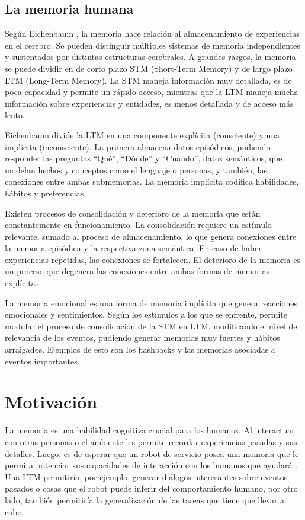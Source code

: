 \subsection{La memoria humana}
Según Eichenbaum \cite{Eichenbaum:2008}, la memoria hace relación al almacenamiento de experiencias en el cerebro. Se pueden distinguir múltiples sistemas de memoria independientes y sustentados por distintas estructuras cerebrales. A grandes rasgos, la memoria se puede dividir en de corto plazo STM (Short-Term Memory) y de largo plazo LTM (Long-Term Memory). La STM maneja información muy detallada, es de poca capacidad y permite un rápido acceso, mientras que la LTM maneja mucha información sobre experiencias y entidades, es menos detallada y de acceso más lento.

Eichenbaum divide la LTM en una componente explícita (consciente) y una implícita (inconsciente). La primera almacena datos episódicos, pudiendo responder las preguntas ``Qué'', ``Dónde'' y ``Cuándo'', datos semánticos, que modelan hechos y conceptos como el lenguaje o personas, y también, las conexiones entre ambas submemorias. La memoria implícita codifica habilidades, hábitos y preferencias.

Existen procesos de consolidación y deterioro de la memoria que están constantemente en funcionamiento. La consolidación requiere un estímulo relevante, sumado al proceso de almacenamiento, lo que genera conexiones entre la memoria episódica y la respectiva zona semántica. En caso de haber experiencias repetidas, las conexiones se fortalecen. El deterioro de la memoria es un proceso que degenera las conexiones entre ambas formas de memorias explícitas.

La memoria emocional es una forma de memoria implícita que genera reacciones emocionales y sentimientos. Según los estímulos a los que se enfrente, permite modular el proceso de consolidación de la STM en LTM, modificando el nivel de relevancia de los eventos, pudiendo generar memorias muy fuertes y hábitos arraigados. Ejemplos de esto son los flashbacks y las memorias asociadas a eventos importantes.




\section{Motivación}

La memoria es una habilidad cognitiva crucial para los humanos. Al interactuar con otras personas o el ambiente les permite recordar experiencias pasadas y sus detalles. Luego, es de esperar que un robot de servicio posea una memoria que le permita potenciar sus capacidades de interacción con los humanos que ayudará \cite{Vijayakumar2014}. Una LTM permitiría, por ejemplo, generar diálogos interesantes sobre eventos pasados o cosas que el robot puede inferir del comportamiento humano, por otro lado, también permitiría la generalización de las tareas que tiene que llevar a cabo.

